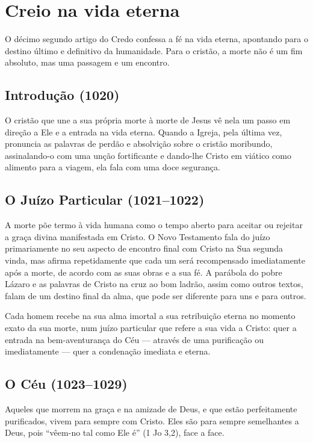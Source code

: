 \chapter{Creio na vida eterna}

O décimo segundo artigo do Credo confessa a fé na vida eterna, apontando para o destino último e definitivo da humanidade. Para o cristão, a morte não é um fim absoluto, mas uma passagem e um encontro.

\section{Introdução (1020)}

O cristão que une a sua própria morte à morte de Jesus vê nela um passo em direção a Ele e a entrada na vida eterna. Quando a Igreja, pela última vez, pronuncia as palavras de perdão e absolvição sobre o cristão moribundo, assinalando-o com uma unção fortificante e dando-lhe Cristo em viático como alimento para a viagem, ela fala com uma doce segurança.

\section{O Juízo Particular (1021--1022)}

A morte põe termo à vida humana como o tempo aberto para aceitar ou rejeitar a graça divina manifestada em Cristo. O Novo Testamento fala do juízo primariamente no seu aspecto de encontro final com Cristo na Sua segunda vinda, mas afirma repetidamente que cada um será recompensado imediatamente após a morte, de acordo com as suas obras e a sua fé. A parábola do pobre Lázaro e as palavras de Cristo na cruz ao bom ladrão, assim como outros textos, falam de um destino final da alma, que pode ser diferente para uns e para outros.

Cada homem recebe na sua alma imortal a sua retribuição eterna no momento exato da sua morte, num juízo particular que refere a sua vida a Cristo: quer a entrada na bem-aventurança do Céu --- através de uma purificação ou imediatamente --- quer a condenação imediata e eterna.

\section{O Céu (1023--1029)}

Aqueles que morrem na graça e na amizade de Deus, e que estão perfeitamente purificados, vivem para sempre com Cristo. Eles são para sempre semelhantes a Deus, pois ``vêem-no tal como Ele é'' (1 Jo 3,2), face a face.

